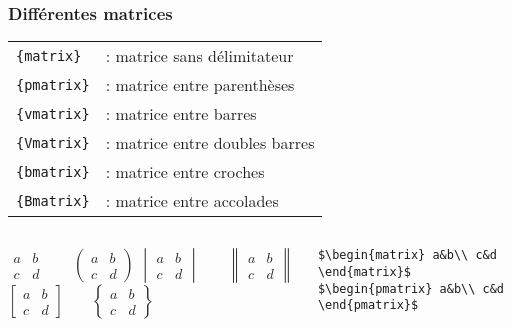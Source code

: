 \begin{frame}[containsverbatim]
    \frametitle{Différentes matrices}
    \footnotesize
    \begin{table}
        \centering
        \begin{tabular}{ll}
            \verb|{matrix}|  & : matrice sans délimitateur    \\
            \verb|{pmatrix}| & : matrice entre parenthèses    \\
            \verb|{vmatrix}| & : matrice entre barres         \\
            \verb|{Vmatrix}| & : matrice entre doubles barres \\
            \verb|{bmatrix}| & : matrice entre croches        \\
            \verb|{Bmatrix}| & : matrice entre accolades      \\
        \end{tabular}
    \end{table}
    \begin{columns}
        \begin{center}
            $\begin{matrix} a&b \\ c&d \end{matrix} \qquad \begin{pmatrix} a&b \\ c&d \end{pmatrix}$
            $\begin{vmatrix} a&b \\ c&d \end{vmatrix} \qquad \begin{Vmatrix} a&b \\ c&d \end{Vmatrix}$
            $\begin{bmatrix} a&b \\ c&d \end{bmatrix} \qquad \begin{Bmatrix} a&b \\ c&d \end{Bmatrix}$
        \end{center}
        \verb|$\begin{matrix} a&b\\ c&d \end{matrix}$|   \\
        \verb|$\begin{pmatrix} a&b\\ c&d \end{pmatrix}$| \\

\end{columns}
\end{frame}
